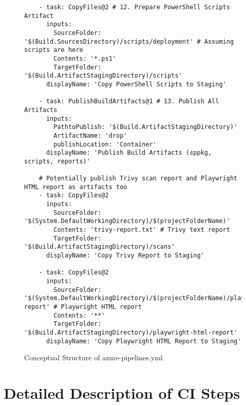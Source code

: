 \begin{figure}[htbp]
{\begin{verbatim}
    - task: CopyFiles@2 # 12. Prepare PowerShell Scripts Artifact
      inputs:
        SourceFolder: '$(Build.SourcesDirectory)/scripts/deployment' # Assuming scripts are here
        Contents: '*.ps1'
        TargetFolder: '$(Build.ArtifactStagingDirectory)/scripts'
      displayName: 'Copy PowerShell Scripts to Staging'

    - task: PublishBuildArtifacts@1 # 13. Publish All Artifacts
      inputs:
        PathtoPublish: '$(Build.ArtifactStagingDirectory)'
        ArtifactName: 'drop'
        publishLocation: 'Container'
      displayName: 'Publish Build Artifacts (sppkg, scripts, reports)'

    # Potentially publish Trivy scan report and Playwright HTML report as artifacts too
    - task: CopyFiles@2
      inputs:
        SourceFolder: '$(System.DefaultWorkingDirectory)/$(projectFolderName)'
        Contents: 'trivy-report.txt' # Trivy text report
        TargetFolder: '$(Build.ArtifactStagingDirectory)/scans'
      displayName: 'Copy Trivy Report to Staging'

    - task: CopyFiles@2
      inputs:
        SourceFolder: '$(System.DefaultWorkingDirectory)/$(projectFolderName)/playwright-report' # Playwright HTML report
        Contents: '**'
        TargetFolder: '$(Build.ArtifactStagingDirectory)/playwright-html-report'
      displayName: 'Copy Playwright HTML Report to Staging'
\end{verbatim}%
    }
    \caption{Conceptual Structure of azure-pipelines.yml}
    \label{fig:ConceptualYAML}
\end{figure}

\section{Detailed Description of CI Steps}
\label{sec:CIDetailedSteps}

